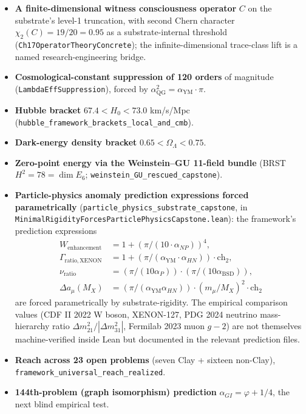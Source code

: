\documentclass[11pt,a4paper,reqno]{amsart}
\theoremstyle{plain}
\theoremstyle{definition}
\theoremstyle{remark}
\newcommand{\aP}{\alpha_{P}}
\newcommand{\aNP}{\alpha_{NP}}
\newcommand{\aYM}{\alpha_{\mathrm{YM}}}
\newcommand{\aBSD}{\alpha_{\mathrm{BSD}}}
\newcommand{\aQG}{\alpha_{\mathrm{QG}}}
\newcommand{\code}[1]{\texttt{#1}}
\begin{document}
\begin{itemize}
\item \textbf{A finite-dimensional witness consciousness operator} $C$
  on the substrate's level-1 truncation, with second Chern character
  $\chi_{2}(C) = 19/20 = 0.95$ as a substrate-internal threshold
  (\code{Ch17OperatorTheoryConcrete}); the infinite-dimensional
  trace-class lift is a named research-engineering bridge.
\item \textbf{Cosmological-constant suppression of 120 orders} of
  magnitude (\code{LambdaEffSuppression}), forced by
  $\aQG^{2} = \aYM \cdot \pi$.
\item \textbf{Hubble bracket} $67.4 < H_{0} < 73.0$ km/s/Mpc
  (\code{hubble\_framework\_brackets\_local\_and\_cmb}).
\item \textbf{Dark-energy density bracket} $0.65 < \Omega_{\Lambda} < 0.75$.
\item \textbf{Zero-point energy via the Weinstein--GU 11-field bundle}
  (BRST $H^{2} = 78 = \dim E_{6}$; \code{weinstein\_GU\_rescued\_capstone}).
\item \textbf{Particle-physics anomaly prediction expressions forced
  parametrically} (\code{particle\_physics\_substrate\_capstone}, in
  \code{MinimalRigidityForcesParticlePhysicsCapstone.lean}): the
  framework's prediction expressions
  \begin{align*}
  W_{\mathrm{enhancement}} &= 1 + (\pi/(10 \cdot \aNP))^{4}, \\
  \Gamma_{\mathrm{ratio,XENON}} &= 1 + (\pi/(\aYM \cdot \alpha_{HN}))
    \cdot \mathrm{ch}_{2}, \\
  \nu_{\mathrm{ratio}} &= (\pi/(10\aP)) \cdot (\pi/(10\aBSD)), \\
  \Delta a_{\mu}(M_{X}) &= (\pi/(\aYM\alpha_{HN})) \cdot (m_{\mu}/M_{X})^{2}
    \cdot \mathrm{ch}_{2}
  \end{align*}
  are forced parametrically by substrate-rigidity. The empirical
  comparison values (CDF II 2022 W boson, XENON-127, PDG 2024
  neutrino mass-hierarchy ratio $\Delta m^{2}_{21}/|\Delta m^{2}_{31}|$,
  Fermilab 2023 muon $g-2$) are not themselves machine-verified
  inside Lean but documented in the relevant prediction files.
\item \textbf{Reach across 23 open problems} (seven Clay + sixteen
  non-Clay), \code{framework\_universal\_reach\_realized}.
\item \textbf{144th-problem (graph isomorphism) prediction}
  $\alpha_{GI} = \varphi + 1/4$, the next blind empirical test.
\end{itemize}
\end{document}
